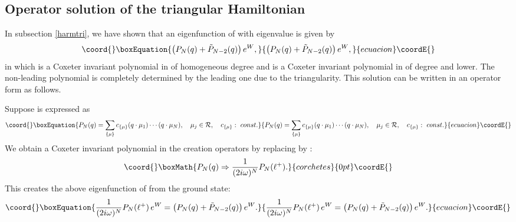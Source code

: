 \documentclass[a4paper,12pt]{article}
\begin{document}
\subsection{Operator solution of the triangular Hamiltonian}
\label{PNcreationop}
In subsection \ref{harmtri}, we have shown that an eigenfunction of
\coordHE{} with eigenvalue \coordHE{} is given by
\begin{equation}\coord{}\boxEquation{
\left(P_N(q)+\tilde{P}_{N-2}(q)\right)e^W,
}{
\left(P_N(q)+\tilde{P}_{N-2}(q)\right)e^W,
}{ecuacion}\coordE{}\end{equation}
in which \coordHE{} is a Coxeter invariant polynomial in \coordHE{}
of homogeneous
degree \coordHE{} and \coordHE{} is a Coxeter invariant
polynomial in
\coordHE{} of degree \coordHE{} and lower. The non-leading polynomial
\coordHE{} is completely determined by the leading one
\coordHE{} due to the triangularity.
This solution can be written in an operator form as follows.

Suppose \coordHE{} is expressed as
\begin{equation}\coord{}\boxEquation{
   P_N(q)=\sum_{\{\mu\}}c_{\{\mu\}}(q\cdot\mu_1)\cdots(q\cdot\mu_N),
   \quad \mu_j\in{\cal R},\quad c_{\{\mu\}}:\ const.
}{
   P_N(q)=\sum_{\{\mu\}}c_{\{\mu\}}(q\cdot\mu_1)\cdots(q\cdot\mu_N),
   \quad \mu_j\in{\cal R},\quad c_{\{\mu\}}:\ const.
}{ecuacion}\coordE{}\end{equation}
We obtain a Coxeter invariant polynomial
in the creation operators \myHighlight{\(\ell^+\)}\coordHE{}
by replacing \coordHE{} by \coordHE{}:
\[\coord{}\boxMath{
   P_N(q)\Rightarrow {1\over{(2i\omega)^N}}P_N(\ell^+).
}{corchetes}{0pt}\coordE{}\]
This creates the above eigenfunction of \coordHE{} from the ground
state:
\begin{equation}\coord{}\boxEquation{
   {1\over{(2i\omega)^N}}P_N(\ell^+)\,e^W=
   \left(P_N(q)+\tilde{P}_{N-2}(q)\right)e^W.
   \label{pncreate}
}{
   {1\over{(2i\omega)^N}}P_N(\ell^+)\,e^W=
   \left(P_N(q)+\tilde{P}_{N-2}(q)\right)e^W.
   }{ecuacion}\coordE{}\end{equation}
\end{document}
